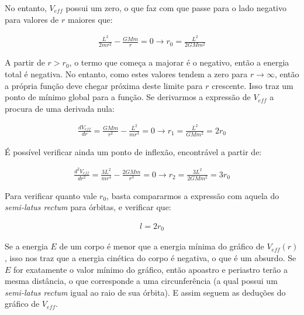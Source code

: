 No entanto, $V_{eff}$ possui um zero, o que faz com que passe para o lado negativo para valores de $r$ maiores que:

\begin{eqnarray}
	\frac{L^2}{2mr^2} - \frac{GMm}{r} = 0 \rightarrow r_0 = \frac{L^2}{2GMm^2}	\label{eq58}
\end{eqnarray} 

A partir de $r > r_0$, o termo que começa a majorar é o negativo, então a energia total é negativa. No entanto, como estes valores tendem a zero para $r \rightarrow \infty$, então a própria função deve chegar próxima deste limite para $r$ crescente. Isso traz um ponto de mínimo global para a função. Se derivarmos a expressão de $V_{eff}$ a procura de uma derivada nula:

\begin{eqnarray}
	\frac{dV_{eff}}{dr} = \frac{GMm}{r^2} -\frac{L^2}{mr^3} = 0 \rightarrow r_1 = \frac{L^2}{GMm^2} = 2r_0	\label{eq59}
\end{eqnarray} 

É possível verificar ainda um ponto de inflexão, encontrável a partir de:

\begin{eqnarray}
	\frac{d^2V_{eff}}{dr^2} = \frac{3L^2}{mr^4} - \frac{2GMm}{r^3}  = 0 \rightarrow r_2 = \frac{3L^2}{2GMm^2} = 3r_0	\label{eq60}
\end{eqnarray}

Para verificar quanto vale $r_0$, basta compararmos a expressão com aquela do \textit{semi-latus rectum} para órbitas, e verificar que:

\begin{eqnarray}
	l = 2r_0	\label{eq61}
\end{eqnarray}

Se a energia $E$ de um corpo é menor que a energia mínima do gráfico de $V_{eff}(r)$, isso nos traz que a energia cinética do corpo é negativa, o que é um absurdo. Se $E$ for exatamente o valor mínimo do gráfico, então apoastro e periastro terão a mesma distância, o que corresponde a uma circunferência (a qual possui um \textit{semi-latus rectum} igual ao raio de sua órbita). E assim seguem as deduções do gráfico de $V_{eff}$.

